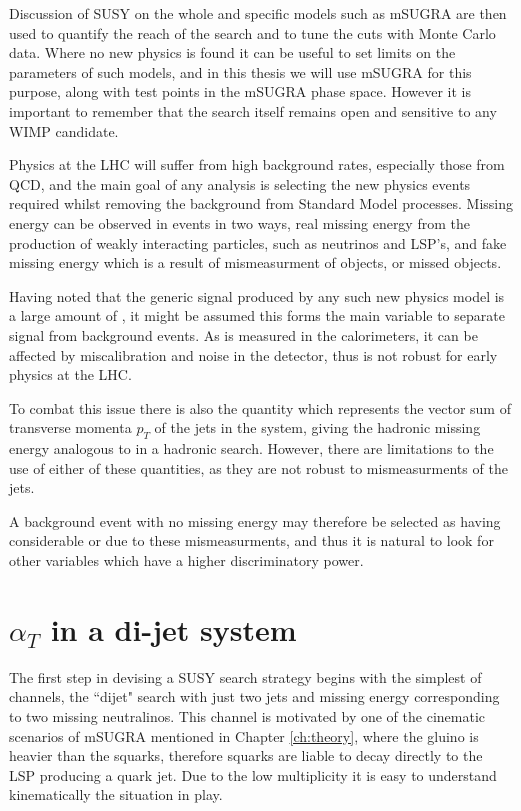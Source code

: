 Discussion of SUSY on the whole and specific models such as mSUGRA are then used to quantify the reach of the search and to tune the cuts with Monte Carlo data. Where no new physics is found it can be useful to set limits on the parameters of such models, and in this thesis we will use mSUGRA for this purpose, along with test points in the mSUGRA phase space. However it is important to remember that the search itself remains open and sensitive to any WIMP candidate. 

Physics at the LHC will suffer from high background rates, especially those from QCD, and the main goal of any analysis is selecting the new physics events required whilst removing the background from Standard Model processes. Missing energy can be observed in events in two ways, real missing energy from the production of weakly interacting particles, such as neutrinos and LSP's, and fake missing energy which is a result of mismeasurment of objects, or missed objects. 

Having noted that the generic signal produced by any such new physics model is a large amount of \met, it might be assumed this forms the main variable to separate signal from background events. As \met is measured in the calorimeters, it can be affected by miscalibration and noise in the detector, thus is not robust for early physics at the LHC. 

To combat this issue there is also the quantity \mht which represents the vector sum of transverse momenta $p_{T}$ of the jets in the system, giving the hadronic missing energy analogous to \met in a hadronic search. However, there are limitations to the use of either of these quantities, as they are not robust to mismeasurments of the jets. 

A background event with no missing energy may therefore be selected as having considerable \met or \mht due to these mismeasurments, and thus it is natural to look for other variables which have a higher discriminatory power. 







\section{$\alpha_{T}$ in a di-jet system}

The first step in devising a SUSY search strategy begins with the simplest of channels, the ``dijet" search with just two jets and missing energy corresponding to two missing neutralinos.  This channel is motivated by one of the cinematic scenarios of mSUGRA mentioned in Chapter \ref{ch:theory}, where the gluino is heavier than the squarks, therefore squarks are liable to decay directly to the LSP producing a quark jet. Due to the low multiplicity it is easy to understand kinematically the situation in play. 

